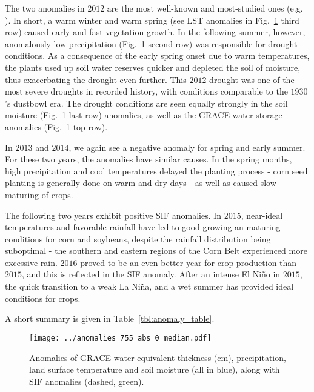 \documentclass[preprint, a4paper, 10pt, times]{elsarticle}
\begin{document}
The two anomalies in $2012$ are the most well-known and most-studied ones (e.g. \citet{wolf2016warm}). In short, a warm winter and warm spring (see LST anomalies in Fig.~\ref{fig:anomalies_0} third row) caused early and fast vegetation growth. In the following summer, however, anomalously low precipitation (Fig.~\ref{fig:anomalies_0} second row) was responsible for drought conditions. As a consequence of the early spring onset due to warm temperatures, the plants used up soil water reserves quicker and depleted the soil of moisture, thus exacerbating the drought even further. This $2012$ drought was one of the most severe droughts in recorded history, with conditions comparable to the $1930$'s dustbowl era. The drought conditions are seen equally strongly in the soil moisture (Fig.~\ref{fig:anomalies_0} last row) anomalies, as well as the GRACE water storage anomalies (Fig.~\ref{fig:anomalies_0} top row). 

In $2013$ and $2014$, we again see a negative anomaly for spring and early summer. For these two years, the anomalies have similar causes. In the spring months, high precipitation and cool temperatures delayed the planting process - corn seed planting is generally done on warm and dry days - as well as caused slow maturing of crops.

The following two years exhibit positive SIF anomalies. In $2015$, near-ideal temperatures and favorable rainfall have led to good growing an maturing conditions for corn and soybeans, despite the rainfall distribution being suboptimal - the southern and eastern regions of the Corn Belt experienced more excessive rain. $2016$ proved to be an even better year for crop production than $2015$, and this is reflected in the SIF anomaly. After an intense El Ni\~no in $2015$, the quick transition to a weak La Ni\~na, and a wet summer has provided ideal conditions for crops.

A short summary is given in Table~\ref{tbl:anomaly_table}.

\begin{figure}[htbp]
\centering
\texttt{[image: ../anomalies\_755\_abs\_0\_median.pdf]}
\caption{Anomalies of GRACE water equivalent thickness (cm), precipitation, land surface temperature and soil moisture (all in blue), along with SIF anomalies (dashed, green).}
\label{fig:anomalies_0}
\end{figure}

\end{document}
